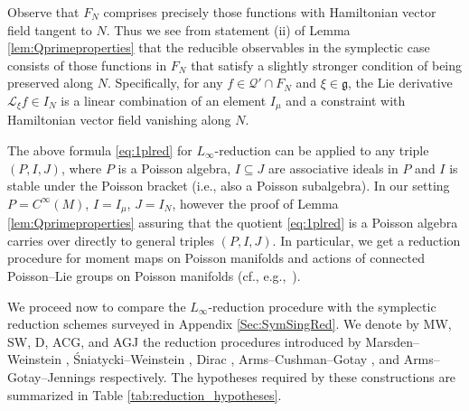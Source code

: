 \documentclass[pdftex]{sigma}
\numberwithin{equation}{section}
\newcommand{\g}{\mathfrak{g}}
\renewcommand{\L}{\mathscr{L}}
\renewcommand{\subset}{\subseteq}
\begin{document}
\begin{Remark}
	Observe that $F_N$ comprises precisely those functions with Hamiltonian vector field tangent to $N$.
	Thus we see from statement (ii) of Lemma \ref{lem:Qprimeproperties} that the reducible observables in the symplectic case consists of those functions in $F_N$ that satisfy a slightly stronger condition of being preserved along $N$. Specifically, for any $f \in\mathcal{Q}'\cap F_N$ and $\xi \in \g$, the Lie derivative $\L_\xi f \in I_N$ is a linear combination of an element $I_\mu$ and a constraint with Hamiltonian vector field vanishing along $N$.
\end{Remark}


\begin{Remark} The above formula \eqref{eq:1plred} for $L_\infty$-reduction can be applied to any triple $(P,I,J)$, where $P$ is a Poisson algebra, $I\subset J$ are associative ideals in $P$ and $I$ is stable under the Poisson bracket (i.e., also a Poisson subalgebra).  In our setting $P=C^{\infty}(M)$, $I=I_\mu$, $J=I_N$, however the proof of Lemma \ref{lem:Qprimeproperties} assuring that the quotient \eqref{eq:1plred} is a Poisson algebra carries over directly to general triples $(P,I,J)$. In particular, we get a reduction procedure for moment maps on Poisson manifolds and actions of connected Poisson--Lie groups on Poisson manifolds (cf., e.g.,~\cite{Esposito2014}).
\end{Remark}

We proceed now to compare the $L_\infty$-reduction procedure with the symplectic reduction schemes surveyed in Appendix \ref{Sec:SymSingRed}.
We denote by MW, SW, D, ACG, and AGJ the reduction procedures introduced by Marsden--Weinstein \cite{MarsdenWeinstein74},  \'Sniatycki--Weinstein \cite{SniatyckiWeinstein83}, Dirac \cite{Dirac64}, Arms--Cushman--Gotay \cite{ArmsCushmanGotay91}, and Arms--Gotay--Jennings \cite{ArmsGotayJennings90} respectively.
The hypotheses required by these constructions are summarized in Table \ref{tab:reduction_hypotheses}.
\end{document}

